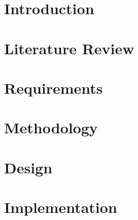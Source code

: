 \documentclass[12pt]{report}
\numberwithin{figure}{chapter}
\begin{document}
\chapter{Introduction}

\chapter{Literature Review}

\chapter{Requirements}

\chapter{Methodology}

\chapter{Design}

\chapter{Implementation}
\end{document}

